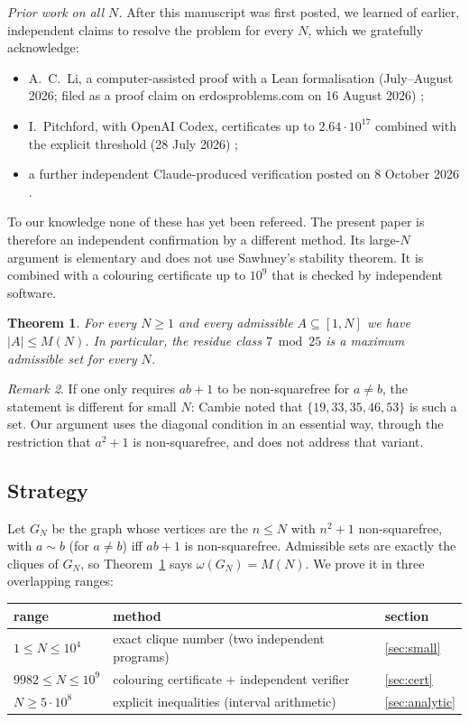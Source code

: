 \documentclass[11pt]{amsart}
\newtheorem{theorem}{Theorem}
\theoremstyle{definition}
\theoremstyle{remark}
\newtheorem{remark}[theorem]{Remark}
\begin{document}
\emph{Prior work on all $N$.} After this manuscript was first posted, we learned of earlier, independent claims
to resolve the problem for every $N$, which we gratefully acknowledge:
\begin{itemize}
\item A.~C.~Li, a computer-assisted proof with a Lean formalisation (July--August 2026; filed as a proof claim
  on erdosproblems.com on 16 August 2026) \cite{Li26};
\item I.~Pitchford, with OpenAI Codex, certificates up to $2.64\cdot10^{17}$ combined with the explicit
  threshold (28 July 2026) \cite{Pi26};
\item a further independent Claude-produced verification posted on 8 October 2026 \cite{AC26}.
\end{itemize}
To our knowledge none of these has yet been refereed. The present paper is therefore an independent confirmation
by a different method. Its large-$N$ argument is elementary and does not use Sawhney's stability theorem. It is
combined with a colouring certificate up to $10^9$ that is checked by independent software.

\begin{theorem}\label{thm:main}
For every $N\ge1$ and every admissible $A\subseteq[1,N]$ we have $|A|\le M(N)$. In particular, the
residue class $7\bmod 25$ is a maximum admissible set for every $N$.
\end{theorem}

\begin{remark}
If one only requires $ab+1$ to be non-squarefree for $a\ne b$, the statement is different for small $N$:
Cambie noted that $\{19,33,35,46,53\}$ is such a set. Our argument uses the diagonal condition in an essential
way, through the restriction that $a^2+1$ is non-squarefree, and does not address that variant.
\end{remark}

\subsection*{Strategy}
Let $G_N$ be the graph whose vertices are the $n\le N$ with $n^2+1$ non-squarefree, with $a\sim b$
(for $a\ne b$) iff $ab+1$ is non-squarefree. Admissible sets are exactly the cliques of $G_N$, so
Theorem~\ref{thm:main} says $\omega(G_N)=M(N)$. We prove it in three overlapping ranges:
\begin{center}
\begin{tabular}{@{}lll@{}}
\toprule
range & method & section\\
\midrule
$1\le N\le 10^4$ & exact clique number (two independent programs) & \ref{sec:small}\\
$9982\le N\le 10^9$ & colouring certificate + independent verifier & \ref{sec:cert}\\
$N\ge 5\cdot 10^8$ & explicit inequalities (interval arithmetic) & \ref{sec:analytic}\\
\bottomrule
\end{tabular}
\end{center}
\end{document}
